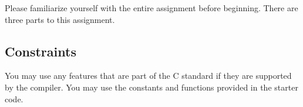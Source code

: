 Please familiarize yourself with the entire assignment before beginning.
There are three parts to this assignment.

%
%
%
%
%
%
%
\subsection{Constraints} \label{subsec:constraints}

You may use any features that are part of the C standard if they are supported by the compiler.
You may use the constants and functions provided in the starter code.

